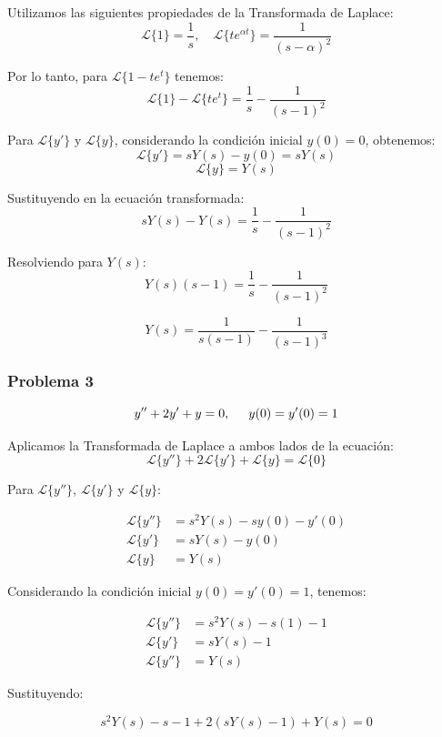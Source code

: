 \documentclass{article}
\begin{document}
Utilizamos las siguientes propiedades de la Transformada de Laplace:
\[
    \mathcal{L}\{1\} = \frac{1}{s}, \quad \mathcal{L}\{te^{\alpha t}\} = \frac{1}{(s - \alpha)^2}
\]

Por lo tanto, para \(\mathcal{L}\{1 - te^{t}\}\) tenemos:
\[
    \mathcal{L}\{1\} - \mathcal{L}\{te^{t}\} = \frac{1}{s} - \frac{1}{(s-1)^2}
\]

Para \(\mathcal{L}\{y'\}\) y \(\mathcal{L}\{y\}\), considerando la condición inicial \(y(0) = 0\), obtenemos:
\[
    \mathcal{L}\{y'\} = sY(s) - y(0) = sY(s)
\]
\[
    \mathcal{L}\{y\} = Y(s)
\]

Sustituyendo en la ecuación transformada:
\[
    sY(s) - Y(s) = \frac{1}{s} - \frac{1}{(s-1)^2}
\]

Resolviendo para \(Y(s)\):
\[
    Y(s)(s - 1) = \frac{1}{s} - \frac{1}{(s-1)^2}
\]

\[
    Y(s) = \frac{1}{s(s - 1)} - \frac{1}{(s-1)^3}
\]

\newpage


\subsubsection{Problema 3}
\[y'' + 2y' + y = 0, \hspace{.5cm} y(0) = y'(0) = 1\]

Aplicamos la Transformada de Laplace a ambos lados de la ecuación:
\[\mathcal{L}\{y''\} + 2\mathcal{L}\{y'\} + \mathcal{L}\{y\} = \mathcal{L}\{0\}\]

Para \(\mathcal{L}\{y''\}\), \(\mathcal{L}\{y'\}\) y \(\mathcal{L}\{y\}\):

\begin{align*}
    \mathcal{L}\{y''\} & = s^2Y(s) - sy(0) - y'(0) \\
    \mathcal{L}\{y'\}  & = sY(s) - y(0)            \\
    \mathcal{L}\{y\}   & = Y(s)
\end{align*}

Considerando la condición inicial \(y(0) = y'(0) = 1\), tenemos:

\begin{align*}
    \mathcal{L}\{y''\} & = s^2Y(s) - s(1) - 1 \\
    \mathcal{L}\{y'\}  & = sY(s) - 1          \\
    \mathcal{L}\{y''\} & = Y(s)
\end{align*}

Sustituyendo:

\[
    s^2Y(s) - s - 1 + 2(sY(s) - 1) + Y(s) = 0
\]
\end{document}
